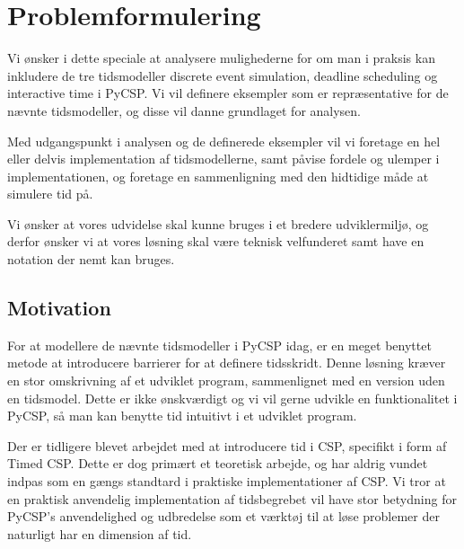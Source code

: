 
\section*{Problemformulering}

Vi ønsker i dette speciale at analysere mulighederne for om man i praksis kan inkludere de tre tidsmodeller discrete event simulation, deadline scheduling og interactive time i PyCSP. Vi vil definere eksempler som er repræsentative for de nævnte tidsmodeller, og disse vil danne grundlaget for analysen.  

Med udgangspunkt i analysen og de definerede eksempler vil vi foretage en hel eller delvis implementation af tidsmodellerne, samt 
påvise fordele og ulemper i implementationen, og foretage en sammenligning med den hidtidige måde at simulere tid på.

Vi ønsker at vores udvidelse skal kunne bruges i et bredere udviklermiljø, og derfor ønsker vi at vores løsning skal være teknisk velfunderet samt have en notation der nemt kan bruges.

\subsection*{Motivation}
For at modellere de nævnte tidsmodeller i PyCSP idag, er en meget benyttet metode at introducere barrierer for at definere tidsskridt. Denne løsning kræver en stor omskrivning af et udviklet program, sammenlignet med en version uden en tidsmodel. Dette er ikke ønskværdigt og vi vil gerne udvikle en funktionalitet i PyCSP, så man kan benytte tid intuitivt i et udviklet program.

Der er tidligere blevet arbejdet med at introducere tid i CSP, specifikt i form af Timed CSP. Dette er dog primært et teoretisk arbejde, og har aldrig vundet indpas som en gængs standtard i praktiske implementationer af CSP. 
Vi tror at en praktisk anvendelig implementation af tidsbegrebet vil have stor betydning for PyCSP's anvendelighed og udbredelse som et værktøj til at løse problemer der naturligt har en dimension af tid. 

